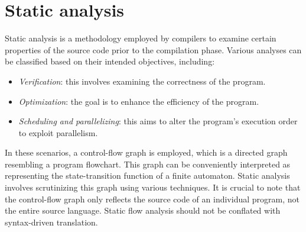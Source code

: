 \section{Static analysis}

Static analysis is a methodology employed by compilers to examine certain properties of the source code prior to the compilation phase.
Various analyses can be classified based on their intended objectives, including:
\begin{itemize}
    \item \textit{Verification}: this involves examining the correctness of the program.
    \item \textit{Optimization}: the goal is to enhance the efficiency of the program.
    \item \textit{Scheduling and parallelizing}: this aims to alter the program's execution order to exploit parallelism.
\end{itemize}
In these scenarios, a control-flow graph is employed, which is a directed graph resembling a program flowchart. 
This graph can be conveniently interpreted as representing the state-transition function of a finite automaton. 
Static analysis involves scrutinizing this graph using various techniques.
It is crucial to note that the control-flow graph only reflects the source code of an individual program, not the entire source language. 
Static flow analysis should not be conflated with syntax-driven translation.


